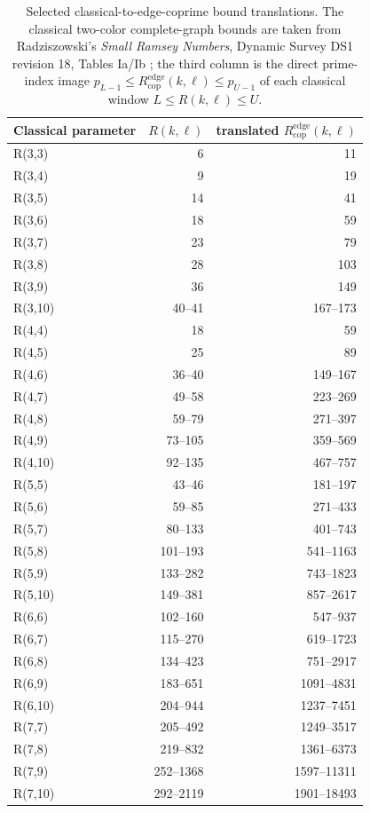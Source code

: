 \documentclass[11pt]{article}
\theoremstyle{plain}
\theoremstyle{definition}
\theoremstyle{remark}
\newcommand{\Redge}{R_{\mathrm{cop}}^{\mathrm{edge}}}
\begin{document}
\begin{table}[htbp]
\centering
\caption{Selected classical-to-edge-coprime bound translations.  The
classical two-color complete-graph bounds are taken from Radziszowski's
\emph{Small Ramsey Numbers}, Dynamic Survey DS1 revision 18, Tables Ia/Ib
\cite{radziszowski2026}; the
third column is the direct prime-index image
$p_{L-1}\le \Redge(k,\ell)\le p_{U-1}$ of each classical window
$L\le R(k,\ell)\le U$.}
\label{tab:edge-bound-transfer}
\small
\begin{tabular}{@{}lrr@{}}
\toprule
Classical parameter & $R(k,\ell)$ & translated $\Redge(k,\ell)$ \\
\midrule
R(3,3) & 6 & 11 \\
R(3,4) & 9 & 19 \\
R(3,5) & 14 & 41 \\
R(3,6) & 18 & 59 \\
R(3,7) & 23 & 79 \\
R(3,8) & 28 & 103 \\
R(3,9) & 36 & 149 \\
R(3,10) & 40--41 & 167--173 \\
R(4,4) & 18 & 59 \\
R(4,5) & 25 & 89 \\
R(4,6) & 36--40 & 149--167 \\
R(4,7) & 49--58 & 223--269 \\
R(4,8) & 59--79 & 271--397 \\
R(4,9) & 73--105 & 359--569 \\
R(4,10) & 92--135 & 467--757 \\
R(5,5) & 43--46 & 181--197 \\
R(5,6) & 59--85 & 271--433 \\
R(5,7) & 80--133 & 401--743 \\
R(5,8) & 101--193 & 541--1163 \\
R(5,9) & 133--282 & 743--1823 \\
R(5,10) & 149--381 & 857--2617 \\
R(6,6) & 102--160 & 547--937 \\
R(6,7) & 115--270 & 619--1723 \\
R(6,8) & 134--423 & 751--2917 \\
R(6,9) & 183--651 & 1091--4831 \\
R(6,10) & 204--944 & 1237--7451 \\
R(7,7) & 205--492 & 1249--3517 \\
R(7,8) & 219--832 & 1361--6373 \\
R(7,9) & 252--1368 & 1597--11311 \\
R(7,10) & 292--2119 & 1901--18493 \\
\bottomrule
\end{tabular}

\end{table}
\end{document}
